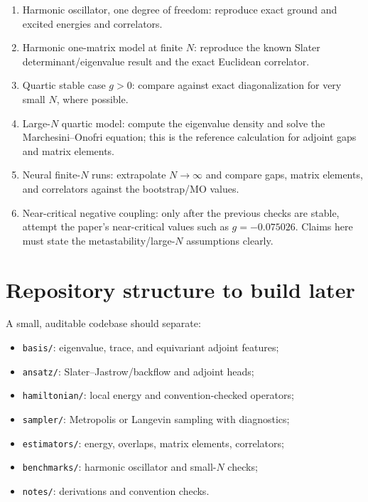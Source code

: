 \documentclass[11pt]{article}
\begin{document}
\begin{enumerate}
  \item Harmonic oscillator, one degree of freedom: reproduce exact ground and
        excited energies and correlators.
  \item Harmonic one-matrix model at finite \(N\): reproduce the known Slater
        determinant/eigenvalue result and the exact Euclidean correlator.
  \item Quartic stable case \(g>0\): compare against exact diagonalization for
        very small \(N\), where possible.
  \item Large-\(N\) quartic model: compute the eigenvalue density and solve the
        Marchesini--Onofri equation; this is the reference calculation for
        adjoint gaps and matrix elements.
  \item Neural finite-\(N\) runs: extrapolate \(N\to\infty\) and compare gaps,
        matrix elements, and correlators against the bootstrap/MO values.
  \item Near-critical negative coupling: only after the previous checks are
        stable, attempt the paper's near-critical values such as
        \(g=-0.075026\).  Claims here must state the metastability/large-\(N\)
        assumptions clearly.
\end{enumerate}

\section{Repository structure to build later}

A small, auditable codebase should separate:
\begin{itemize}
  \item \texttt{basis/}: eigenvalue, trace, and equivariant adjoint features;
  \item \texttt{ansatz/}: Slater--Jastrow/backflow and adjoint heads;
  \item \texttt{hamiltonian/}: local energy and convention-checked operators;
  \item \texttt{sampler/}: Metropolis or Langevin sampling with diagnostics;
  \item \texttt{estimators/}: energy, overlaps, matrix elements, correlators;
  \item \texttt{benchmarks/}: harmonic oscillator and small-\(N\) checks;
  \item \texttt{notes/}: derivations and convention checks.
\end{itemize}
\end{document}
